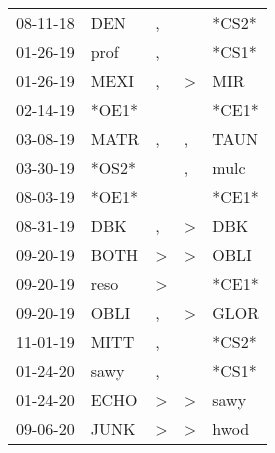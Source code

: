 \begin{supertabular}{p{0.07\textwidth}p{0.06\textwidth}p{0.02\textwidth}p{0.02\textwidth}p{0.06\textwidth}}
          08-11-18\textsuperscript{} &            DEN\textsuperscript{} &                , &                  &                            *CS2* \\
          01-26-19\textsuperscript{} &           prof\textsuperscript{} &                , &                  &                            *CS1* \\
          01-26-19\textsuperscript{} &           MEXI\textsuperscript{} &                , &     \textgreater &            MIR\textsuperscript{} \\
          02-14-19\textsuperscript{} &                            *OE1* &                  &                  &                            *CE1* \\
          03-08-19\textsuperscript{} &           MATR\textsuperscript{} &                , &                , &           TAUN\textsuperscript{} \\
          03-30-19\textsuperscript{} &                            *OS2* &                  &                , &           mulc\textsuperscript{} \\
          08-03-19\textsuperscript{} &                            *OE1* &                  &                  &                            *CE1* \\
          08-31-19\textsuperscript{} &            DBK\textsuperscript{} &                , &     \textgreater &            DBK\textsuperscript{} \\
          09-20-19\textsuperscript{} &           BOTH\textsuperscript{} &     \textgreater &     \textgreater &           OBLI\textsuperscript{} \\
          09-20-19\textsuperscript{} &           reso\textsuperscript{} &     \textgreater &                  &                            *CE1* \\
          09-20-19\textsuperscript{} &           OBLI\textsuperscript{} &                , &     \textgreater &           GLOR\textsuperscript{} \\
          11-01-19\textsuperscript{} &           MITT\textsuperscript{} &                , &                  &                            *CS2* \\
          01-24-20\textsuperscript{} &           sawy\textsuperscript{} &                , &                  &                            *CS1* \\
          01-24-20\textsuperscript{} &           ECHO\textsuperscript{} &     \textgreater &     \textgreater &           sawy\textsuperscript{} \\
          09-06-20\textsuperscript{} &           JUNK\textsuperscript{} &     \textgreater &     \textgreater &           hwod\textsuperscript{} \\
\end{supertabular}
